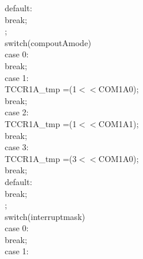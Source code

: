 \documentclass[titlepage, a4paper, 10pt, reqno, openany]{report}
\begin{document}
\begin{minipage}[t]{.35\linewidth}
	\tiny
	\hspace*{1cm}		default: \\
	\hspace*{1.5cm}			break; \\
	\hspace*{.5cm}	\textbraceright ; \\
	\hspace*{.5cm}	switch(compoutAmode)\textbraceleft \\
	\hspace*{1cm}		case 0: \\
	\hspace*{1.5cm}			break; \\
	\hspace*{1cm}		case 1: \\
	\hspace*{1.5cm}			TCCR1A\_tmp \textbar =(1$<<$COM1A0); \\
	\hspace*{1.5cm}			break; \\
	\hspace*{1cm}		case 2: \\
	\hspace*{1.5cm}			TCCR1A\_tmp \textbar =(1$<<$COM1A1); \\
	\hspace*{1.5cm}			break; \\
	\hspace*{1cm}		case 3: \\
	\hspace*{1.5cm}			TCCR1A\_tmp \textbar =(3$<<$COM1A0); \\
	\hspace*{1.5cm}			break; \\
	\hspace*{1cm}		default: \\
	\hspace*{1.5cm}			break; \\
	\hspace*{.5cm}	\textbraceright ; \\
	\hspace*{.5cm}	switch(interruptmask)\textbraceleft \\
	\hspace*{1cm}		case 0: \\
	\hspace*{1.5cm}			break; \\
	\hspace*{1cm}		case 1: \\

\end{minipage}
\end{document}
